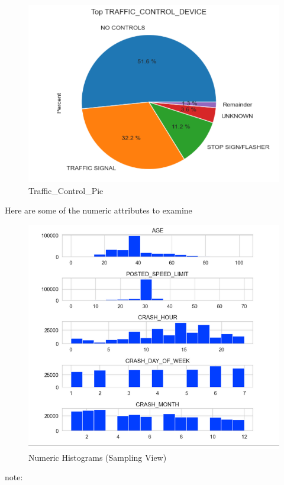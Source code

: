 \documentclass[conference]{IEEEtran}
\begin{document}
 \begin{figure}[!h]
	\includegraphics[width=\linewidth]{Traffic_Control_Pie.png}
	\caption{Traffic_Control_Pie}
	\label{fig: Traffic_Control_Pie}
 \end{figure}
 Here are some of the numeric attributes to examine
 \begin{figure}[!h]
	\includegraphics[width=\linewidth]{Numerical_Hist.png}
	\caption{Numeric Histograms (Sampling View)}
	\label{fig: Numeric Histograms}
 \end{figure}

 note:
\end{document}
